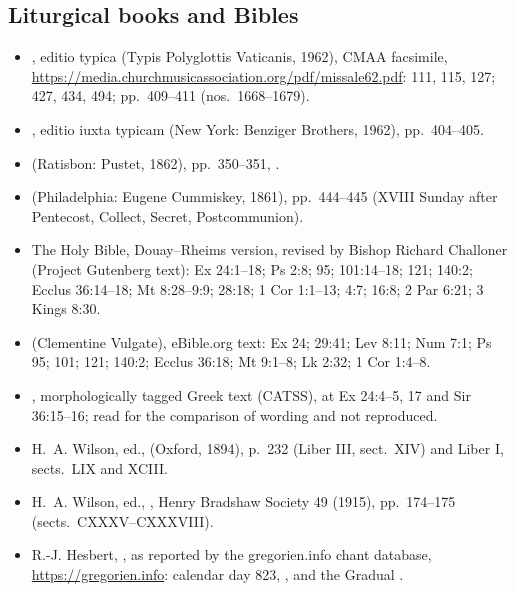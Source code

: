 {\footnotesize
\subsection*{Liturgical books and Bibles}
\begin{itemize}
\item {}, editio typica (Typis Polyglottis Vaticanis, 1962), CMAA facsimile, \url{https://media.churchmusicassociation.org/pdf/missale62.pdf}:  111, 115, 127;  427, 434, 494; pp.~409--411 (nos.~1668--1679).
\item {}, editio iuxta typicam (New York: Benziger Brothers, 1962), pp.~404--405.
\item {} (Ratisbon: Pustet, 1862), pp.~350--351, .
\item {} (Philadelphia: Eugene Cummiskey, 1861), pp.~444--445 (XVIII Sunday after Pentecost, Collect, Secret, Postcommunion).
\item The Holy Bible, Douay--Rheims version, revised by Bishop Richard Challoner (Project Gutenberg text): Ex 24:1--18; Ps 2:8; 95; 101:14--18; 121; 140:2; Ecclus 36:14--18; Mt 8:28--9:9; 28:18; 1 Cor 1:1--13; 4:7; 16:8; 2 Par 6:21; 3 Kings 8:30.
\item {} (Clementine Vulgate), eBible.org text: Ex 24; 29:41; Lev 8:11; Num 7:1; Ps 95; 101; 121; 140:2; Ecclus 36:18; Mt 9:1--8; Lk 2:32; 1 Cor 1:4--8.
\item {}, morphologically tagged Greek text (CATSS), at Ex 24:4--5, 17 and Sir 36:15--16; read for the comparison of wording and not reproduced.
\item H.~A. Wilson, ed.,  (Oxford, 1894), p.~232 (Liber III, sect.~XIV) and Liber I, sects.~LIX and XCIII.
\item H.~A. Wilson, ed., , Henry Bradshaw Society 49 (1915), pp.~174--175 (sects.~CXXXV--CXXXVIII).
\item R.-J. Hesbert, , as reported by the gregorien.info chant database, \url{https://gregorien.info}: calendar day 823, , and the Gradual .

\end{itemize}}
